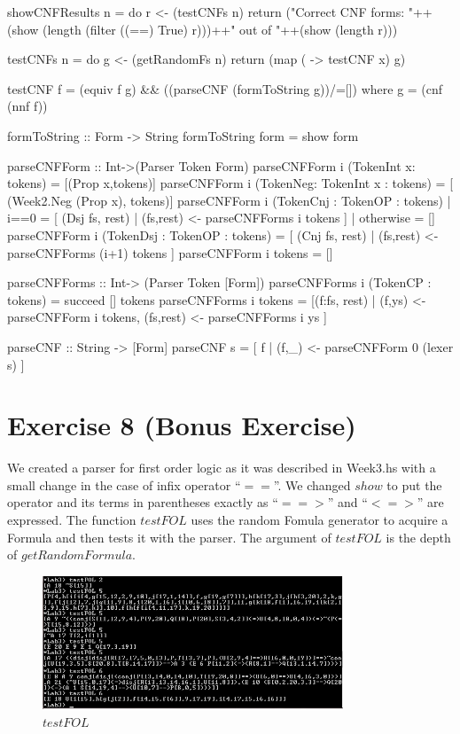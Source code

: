 \documentclass{article}
\begin{document}
\begin{code}
showCNFResults n = do
		      r <- (testCNFs n)
		      return ("Correct CNF forms: "++(show (length (filter ((==)
				True) r)))++" out of "++(show (length r)))

testCNFs n = do
		      g <- (getRandomFs n)
		      return (map ( \x -> testCNF x) g)
 
testCNF f = (equiv f g) && ((parseCNF (formToString g))/=[]) where g = (cnf (nnf f))
 
formToString :: Form -> String
formToString form = show form

parseCNFForm :: Int->(Parser Token Form) 
parseCNFForm i (TokenInt x: tokens) = [(Prop x,tokens)]
parseCNFForm i (TokenNeg: TokenInt x : tokens) = [ (Week2.Neg (Prop x), tokens)]
parseCNFForm i (TokenCnj : TokenOP : tokens) | i==0 = [ (Dsj fs, rest) | (fs,rest) <- parseCNFForms i tokens ]
					     | otherwise = []
parseCNFForm i (TokenDsj : TokenOP : tokens) = [ (Cnj fs, rest) | (fs,rest) <- parseCNFForms (i+1) tokens ]
parseCNFForm i tokens = []

parseCNFForms :: Int-> (Parser Token [Form]) 
parseCNFForms i (TokenCP : tokens) = succeed [] tokens
parseCNFForms i tokens = [(f:fs, rest) | (f,ys) <- parseCNFForm i tokens, (fs,rest) <- parseCNFForms i ys ]

parseCNF :: String -> [Form]
parseCNF s = [ f | (f,_) <- parseCNFForm 0 (lexer s) ]
\end{code}

\section*{Exercise 8 (Bonus Exercise)}
We created a parser for first order logic as it was described in Week3.hs
with a small change in the case of infix operator ``$==$''. We changed $show$
to put the operator and its terms in parentheses exactly as ``$ = = > $'' and
``$ < = >$'' are expressed. The function $testFOL$ uses the random Fomula
generator to acquire a Formula and then tests it with the parser. The argument
of $testFOL$ is the depth of $getRandomFormula$.

\begin{figure}[ht]
\centering
\includegraphics[width=0.8\textwidth]{FOLparser.jpg}
\caption{$testFOL$}
\label{fig:tstFOL}
\end{figure}
\end{document}
